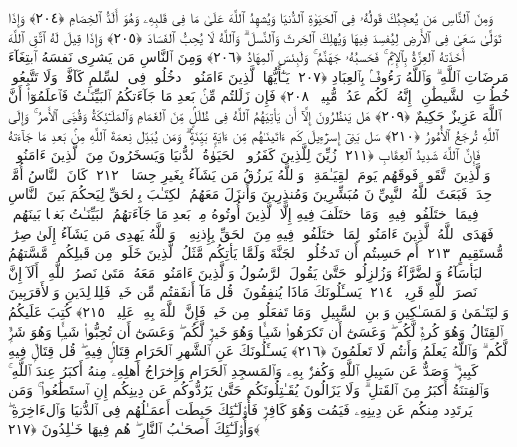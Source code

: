  وَمِنَ ٱلنَّاسِ مَن يُعجِبُكَ قَولُهُۥ فِى ٱلحَيَوٰةِ ٱلدُّنيَا وَيُشهِدُ ٱللَّهَ عَلَىٰ مَا فِى قَلبِهِۦ وَهُوَ أَلَدُّ ٱلخِصَامِ ﴿٢٠٤﴾
 وَإِذَا تَوَلَّىٰ سَعَىٰ فِى ٱلأَرضِ لِيُفسِدَ فِيهَا وَيُهلِكَ ٱلحَرثَ وَٱلنَّسلَ ۗ وَٱللَّهُ لَا يُحِبُّ ٱلفَسَادَ ﴿٢٠٥﴾
 وَإِذَا قِيلَ لَهُ ٱتَّقِ ٱللَّهَ أَخَذَتهُ ٱلعِزَّةُ بِٱلإِثمِ ۚ فَحَسبُهُۥ جَهَنَّمُ ۚ وَلَبِئسَ ٱلمِهَادُ ﴿٢٠٦﴾
 وَمِنَ ٱلنَّاسِ مَن يَشرِى نَفسَهُ ٱبتِغَآءَ مَرضَاتِ ٱللَّهِ ۗ وَٱللَّهُ رَءُوفٌۢ بِٱلعِبَادِ ﴿٢٠٧﴾
 يَـٰٓأَيُّهَا ٱلَّذِينَ ءَامَنُوا۟ ٱدخُلُوا۟ فِى ٱلسِّلمِ كَآفَّةًۭ وَلَا تَتَّبِعُوا۟ خُطُوَٟتِ ٱلشَّيطَٰنِ ۚ إِنَّهُۥ لَكُم عَدُوٌّۭ مُّبِينٌۭ ﴿٢٠٨﴾
 فَإِن زَلَلتُم مِّنۢ بَعدِ مَا جَآءَتكُمُ ٱلبَيِّنَـٰتُ فَٱعلَمُوٓا۟ أَنَّ ٱللَّهَ عَزِيزٌ حَكِيمٌ ﴿٢٠٩﴾
 هَل يَنظُرُونَ إِلَّآ أَن يَأتِيَهُمُ ٱللَّهُ فِى ظُلَلٍۢ مِّنَ ٱلغَمَامِ وَٱلمَلَـٰٓئِكَةُ وَقُضِىَ ٱلأَمرُ ۚ وَإِلَى ٱللَّهِ تُرجَعُ ٱلأُمُورُ ﴿٢١٠﴾
 سَل بَنِىٓ إِسرَٰٓءِيلَ كَم ءَاتَينَـٰهُم مِّن ءَايَةٍۭ بَيِّنَةٍۢ ۗ وَمَن يُبَدِّل نِعمَةَ ٱللَّهِ مِنۢ بَعدِ مَا جَآءَتهُ فَإِنَّ ٱللَّهَ شَدِيدُ ٱلعِقَابِ ﴿٢١١﴾
 زُيِّنَ لِلَّذِينَ كَفَرُوا۟ ٱلحَيَوٰةُ ٱلدُّنيَا وَيَسخَرُونَ مِنَ ٱلَّذِينَ ءَامَنُوا۟ ۘ وَٱلَّذِينَ ٱتَّقَوا۟ فَوقَهُم يَومَ ٱلقِيَـٰمَةِ ۗ وَٱللَّهُ يَرزُقُ مَن يَشَآءُ بِغَيرِ حِسَابٍۢ ﴿٢١٢﴾
 كَانَ ٱلنَّاسُ أُمَّةًۭ وَٟحِدَةًۭ فَبَعَثَ ٱللَّهُ ٱلنَّبِيِّۦنَ مُبَشِّرِينَ وَمُنذِرِينَ وَأَنزَلَ مَعَهُمُ ٱلكِتَـٰبَ بِٱلحَقِّ لِيَحكُمَ بَينَ ٱلنَّاسِ فِيمَا ٱختَلَفُوا۟ فِيهِ ۚ وَمَا ٱختَلَفَ فِيهِ إِلَّا ٱلَّذِينَ أُوتُوهُ مِنۢ بَعدِ مَا جَآءَتهُمُ ٱلبَيِّنَـٰتُ بَغيًۢا بَينَهُم ۖ فَهَدَى ٱللَّهُ ٱلَّذِينَ ءَامَنُوا۟ لِمَا ٱختَلَفُوا۟ فِيهِ مِنَ ٱلحَقِّ بِإِذنِهِۦ ۗ وَٱللَّهُ يَهدِى مَن يَشَآءُ إِلَىٰ صِرَٰطٍۢ مُّستَقِيمٍ ﴿٢١٣﴾
 أَم حَسِبتُم أَن تَدخُلُوا۟ ٱلجَنَّةَ وَلَمَّا يَأتِكُم مَّثَلُ ٱلَّذِينَ خَلَوا۟ مِن قَبلِكُم ۖ مَّسَّتهُمُ ٱلبَأسَآءُ وَٱلضَّرَّآءُ وَزُلزِلُوا۟ حَتَّىٰ يَقُولَ ٱلرَّسُولُ وَٱلَّذِينَ ءَامَنُوا۟ مَعَهُۥ مَتَىٰ نَصرُ ٱللَّهِ ۗ أَلَآ إِنَّ نَصرَ ٱللَّهِ قَرِيبٌۭ ﴿٢١٤﴾
 يَسـَٔلُونَكَ مَاذَا يُنفِقُونَ ۖ قُل مَآ أَنفَقتُم مِّن خَيرٍۢ فَلِلوَٟلِدَينِ وَٱلأَقرَبِينَ وَٱليَتَـٰمَىٰ وَٱلمَسَـٰكِينِ وَٱبنِ ٱلسَّبِيلِ ۗ وَمَا تَفعَلُوا۟ مِن خَيرٍۢ فَإِنَّ ٱللَّهَ بِهِۦ عَلِيمٌۭ ﴿٢١٥﴾
 كُتِبَ عَلَيكُمُ ٱلقِتَالُ وَهُوَ كُرهٌۭ لَّكُم ۖ وَعَسَىٰٓ أَن تَكرَهُوا۟ شَيـًۭٔا وَهُوَ خَيرٌۭ لَّكُم ۖ وَعَسَىٰٓ أَن تُحِبُّوا۟ شَيـًۭٔا وَهُوَ شَرٌّۭ لَّكُم ۗ وَٱللَّهُ يَعلَمُ وَأَنتُم لَا تَعلَمُونَ ﴿٢١٦﴾
 يَسـَٔلُونَكَ عَنِ ٱلشَّهرِ ٱلحَرَامِ قِتَالٍۢ فِيهِ ۖ قُل قِتَالٌۭ فِيهِ كَبِيرٌۭ ۖ وَصَدٌّ عَن سَبِيلِ ٱللَّهِ وَكُفرٌۢ بِهِۦ وَٱلمَسجِدِ ٱلحَرَامِ وَإِخرَاجُ أَهلِهِۦ مِنهُ أَكبَرُ عِندَ ٱللَّهِ ۚ وَٱلفِتنَةُ أَكبَرُ مِنَ ٱلقَتلِ ۗ وَلَا يَزَالُونَ يُقَـٰتِلُونَكُم حَتَّىٰ يَرُدُّوكُم عَن دِينِكُم إِنِ ٱستَطَٰعُوا۟ ۚ وَمَن يَرتَدِد مِنكُم عَن دِينِهِۦ فَيَمُت وَهُوَ كَافِرٌۭ فَأُو۟لَـٰٓئِكَ حَبِطَت أَعمَـٰلُهُم فِى ٱلدُّنيَا وَٱلءَاخِرَةِ ۖ وَأُو۟لَـٰٓئِكَ أَصحَـٰبُ ٱلنَّارِ ۖ هُم فِيهَا خَـٰلِدُونَ ﴿٢١٧﴾
